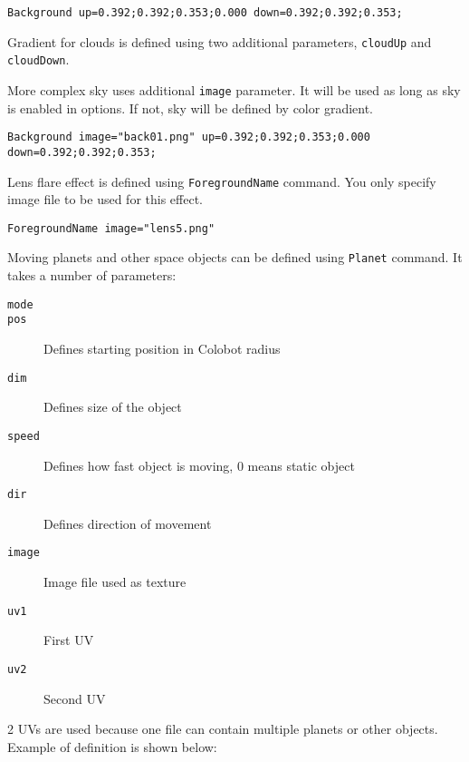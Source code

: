 \begin{lstlisting}[style=scene]
Background up=0.392;0.392;0.353;0.000 down=0.392;0.392;0.353;
\end{lstlisting}

Gradient for clouds is defined using two additional parameters, \texttt{cloudUp} and \texttt{cloudDown}.


More complex sky uses additional \texttt{image} parameter. It will be used as long as sky is enabled in options. If not, sky will be defined by color gradient.

\begin{lstlisting}[style=scene]
Background image="back01.png" up=0.392;0.392;0.353;0.000 down=0.392;0.392;0.353;
\end{lstlisting}

Lens flare effect is defined using \texttt{ForegroundName} command. You only specify image file to be used for this effect.

\begin{lstlisting}[style=scene]
ForegroundName image="lens5.png"
\end{lstlisting}


Moving planets and other space objects can be defined using \texttt{Planet} command. It takes a number of parameters:


\begin{description}
    \item[\texttt{mode}] 
    \item[\texttt{pos}] Defines starting position in Colobot radius
    \item[\texttt{dim}] Defines size of the object
    \item[\texttt{speed}] Defines how fast object is moving, 0 means static object
    \item[\texttt{dir}] Defines direction of movement
    \item[\texttt{image}] Image file used as texture
    \item[\texttt{uv1}] First UV
    \item[\texttt{uv2}] Second UV
\end{description}

2 UVs are used because one file can contain multiple planets or other objects. Example of definition is shown below:

